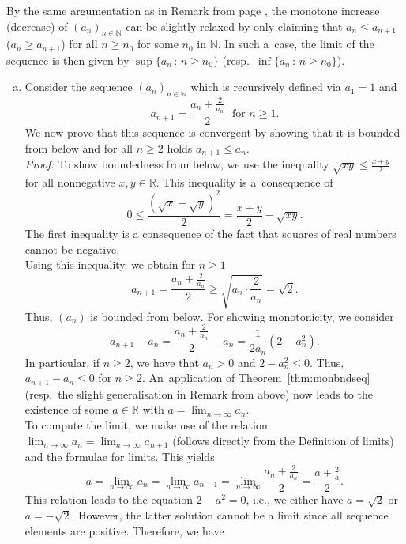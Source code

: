 \begin{Remark}{}\label{rem:monseqgen}
    By the same argumentation as in Remark from page \pageref{rem:n_0mon}, the monotone increase (decrease) of $(a_n)_{n\in\mathbb{N}}$ can be slightly relaxed by only claiming that $a_n\leq a_{n+1}$ ($a_n\geq a_{n+1}$) for all $n\geq n_0$ for some $n_0$ in $\mathbb{N}$. In such a~case, the limit of the sequence is then given by $\sup\{a_n\,:\,n\geq n_0\}$ (resp.\ $\inf\{a_n\,:\,n\geq n_0\}$).
\end{Remark}

\begin{example}{}\label{ex:monseqconv}
 \begin{enumerate}[a)]
  \item Consider the sequence $(a_n)_{n\in\mathbb{N}}$ which is recursively defined via $a_1=1$ and 
  \[a_{n+1}=\frac{a_n+\frac2{a_n}}{2}\;\text{  for $n\geq 1$.}\] 
  We now prove that this sequence is convergent by showing that
it is bounded from below and for all $n\geq2$ holds $a_{n+1}\leq a_n$.\\[2ex]
{\em Proof:} To show boundedness from below, we use the inequality $\sqrt{xy}\leq\frac{x+y}2$ for all nonnegative $x,y\in\mathbb{R}$. This inequality is a~consequence of
\[0\leq\frac{(\sqrt{x}-\sqrt{y})^2}2=\frac{x+y}2-\sqrt{xy}.\]
The first inequality is a consequence of the fact that squares of real numbers cannot be negative.\\
Using this inequality, we obtain for $n\geq1$
\[a_{n+1}=\frac{a_n+\frac{2}{a_n}}{2}\geq \sqrt{a_n\cdot\frac2{a_n}}=\sqrt{2}.\]
Thus, $(a_n)$ is bounded from below. For showing monotonicity, we consider
\[a_{n+1}-a_n=\frac{a_n+\frac2{a_n}}{2}-a_n=\frac{1}{2a_n}(2-a_n^2).\]
In particular, if $n\geq2$, we have that $a_n>0$ and $2-a_n^2\leq0$. Thus, $a_{n+1}-a_n\leq0$ for $n\geq2$. An~application of Theorem~\ref{thm:monbndseq} (resp.\ the slight generalisation in Remark %
from above) 
now leads to the existence of some $a\in\mathbb{R}$ with $a=\lim_{n	\to\infty}a_n$.\\[2ex]
To compute the limit, we make use of the relation $\lim_{n \to\infty}a_n=\lim_{n\to\infty}a_{n+1}$ (follows directly from the Definition of limits) and the formulae for limits. This yields
\[a=\lim_{n \to\infty}a_n=\lim_{n\to\infty}a_{n+1}=\lim_{n\to\infty}\frac{a_n+\frac2{a_n}}{2}=\frac{a+\frac2{a}}{2}.\]
This relation leads to the equation $2-a^2=0$, i.e., we either have $a=\sqrt{2}$ or $a=-\sqrt{2}$. However, the latter solution cannot be a limit since all sequence elements are positive. Therefore, we have

\end{enumerate}
\end{example}
